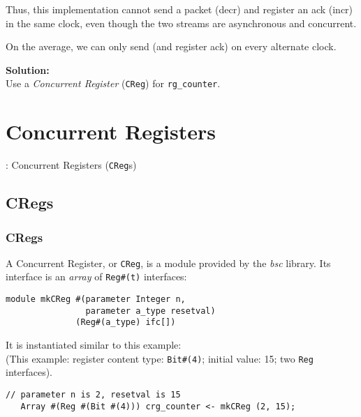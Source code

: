 \begin{frame}[fragile]
\begin{minipage}{0.5\textwidth}
{\scriptsize
Thus, this implementation cannot send a packet (decr) and
register an ack (incr) in the same clock, even though the two streams
are asynchronous and concurrent.}

\vspace{1ex}

{\scriptsize
On the average, we can only send (and register ack) on every alternate clock.}

\vspace{3ex}

{\bf Solution:} \\
Use a \emph{Concurrent Register} ({\tt CReg}) for {\tt rg\_counter}.

\end{minipage}

\end{frame}


\section{Concurrent Registers}

\begin{frame}

\begin{center}
  {\LARGE {\BSV}: Concurrent Registers ({\tt CReg}s)}
\end{center}

\end{frame}


\subsection{CRegs}

\begin{frame}[fragile]
\frametitle{CRegs}

\footnotesize

A Concurrent Register, or \verb|CReg|, is a module provided by
 the \emph{bsc} library.  Its interface is an \emph{array}
 of \verb|Reg#(t)| interfaces:

\begin{Verbatim}[frame=single]
module mkCReg #(parameter Integer n,
                parameter a_type resetval)
              (Reg#(a_type) ifc[])
\end{Verbatim}

\vspace{5ex}

It is instantiated similar to this example: \\
(This example: register content type: \verb|Bit#(4)|; initial value: 15; two {\tt Reg} interfaces).

\begin{Verbatim}[frame=single]
   // parameter n is 2, resetval is 15
   Array #(Reg #(Bit #(4))) crg_counter <- mkCReg (2, 15);
\end{Verbatim}

\end{frame}

